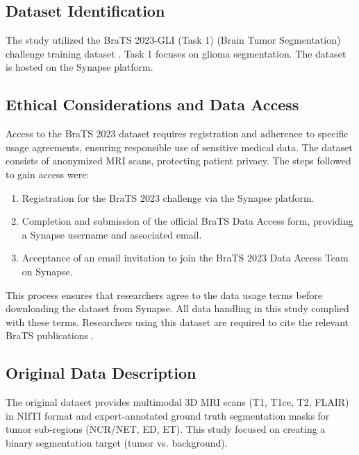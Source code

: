 \subsection{Dataset Identification}
The study utilized the BraTS 2023-GLI (Task 1) (Brain Tumor Segmentation) challenge training dataset \parencite{baid2021rsna, menze2015multimodal, bakas2017advancing}. Task 1 focuses on glioma segmentation. The dataset is hosted on the Synapse platform.

\subsection{Ethical Considerations and Data Access}
Access to the BraTS 2023 dataset requires registration and adherence to specific usage agreements, ensuring responsible use of sensitive medical data. The dataset consists of anonymized MRI scans, protecting patient privacy. The steps followed to gain access were:
\begin{enumerate}
  \item Registration for the BraTS 2023 challenge via the Synapse platform.
  \item Completion and submission of the official BraTS Data Access form, providing a Synapse username and associated email.
  \item Acceptance of an email invitation to join the BraTS 2023 Data Access Team on Synapse.
\end{enumerate}
This process ensures that researchers agree to the data usage terms before downloading the dataset from Synapse. All data handling in this study complied with these terms. Researchers using this dataset are required to cite the relevant BraTS publications \parencite{baid2021rsna, menze2015multimodal, bakas2017advancing, bakas2017segmentationGBM, bakas2017segmentationLGG}.

\subsection{Original Data Description}
The original dataset provides multimodal 3D MRI scans (T1, T1ce, T2, FLAIR) in NIfTI format and expert-annotated ground truth segmentation masks for tumor sub-regions (NCR/NET, ED, ET). This study focused on creating a binary segmentation target (tumor vs. background).

